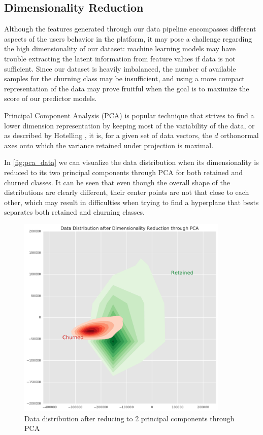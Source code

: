 \documentclass{kththesis}
\begin{document}
\subsection{Dimensionality Reduction}

Although the features generated through our data pipeline encompasses different aspects of the users behavior in the platform, it may pose a challenge regarding the high dimensionality of our dataset: machine learning models may have trouble extracting the latent information from feature values if data is not sufficient. Since our dataset is heavily imbalanced, the number of available samples for the churning class may be insufficient, and using a more compact representation of the data may prove fruitful when the goal is to maximize the score of our predictor models.

Principal Component Analysis (PCA) is popular technique that strives to find a lower dimension representation by keeping most of the variability of the data, or as described by Hotelling \citep{hotelling1933analysis}, it is, for a given set of data vectors, the $d$ orthonormal axes onto which the variance retained under projection is maximal.

In \autoref{fig:pca_data} we can visualize the data distribution when its dimensionality is reduced to its two principal components through PCA for both retained and churned classes. It can be seen that even though the overall shape of the distributions are clearly different, their center points are not that close to each other, which may result in difficulties when trying to find a hyperplane that bests separates both retained and churning classes.

	\begin{figure}[h]
    \centering
    \includegraphics[width=0.9\textwidth,keepaspectratio]{figures/pca_data.pdf}
    \caption{Data distribution after reducing to 2 principal components through PCA}
    \label{fig:pca_data}
	\end{figure}
\end{document}
